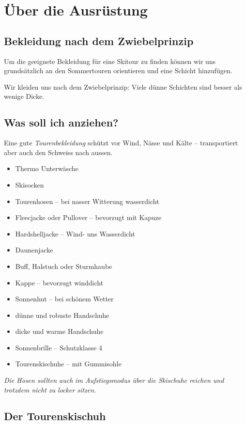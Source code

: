\section{Über die Ausrüstung}

\subsection{Bekleidung nach dem Zwiebelprinzip}

Um die geeignete Bekleidung für eine Skitour zu finden können wir uns grundsätzlich an den Sommertouren orientieren und eine Schicht hinzufügen.

Wir kleiden uns nach dem Zwiebelprinzip: Viele dünne Schichten sind besser als wenige Dicke.

\subsection{Was soll ich anziehen?}

Eine gute \textit{Tourenbekleidung} schützt vor Wind, Nässe und Kälte -- transportiert aber auch den Schweiss nach aussen.

\begin{itemize}
  \item{Thermo Unterwäsche}
  \item{Skisocken}
  \item{Tourenhosen -- bei nasser Witterung wasserdicht}
  \item{Fleecjacke oder Pullover -- bevorzugt mit Kapuze}
  \item{Hardshelljacke -- Wind- uns Wasserdicht}
  \item{Daunenjacke}
  \item{Buff, Halstuch oder Sturmhaube}
  \item{Kappe -- bevorzugt winddicht}
  \item{Sonnenhut -- bei schönem Wetter}
  \item{dünne und robuste Handschuhe}
  \item{dicke und warme Handschuhe}
  \item{Sonnenbrille -- Schutzklasse 4}
  \item{Tourenskischuhe -- mit Gummisohle}
\end{itemize}

\textit{Die Hosen sollten auch im Aufstiegsmodus über die Skischuhe reichen und trotzdem nicht zu locker sitzen.}

\subsection{Der Tourenskischuh}

